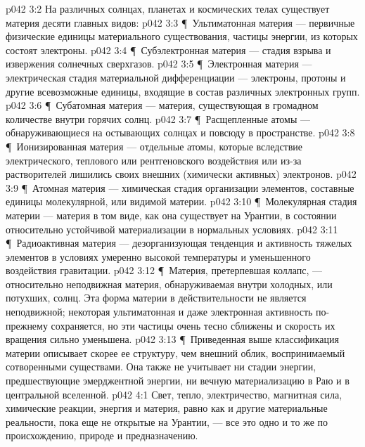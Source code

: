 \vs p042 3:2 На различных солнцах, планетах и космических телах существует материя десяти главных видов:
\vs p042 3:3 \P\ \bibnobreakspace Ультиматонная материя --- первичные физические единицы материального существования, частицы энергии, из которых состоят электроны.
\vs p042 3:4 \P\ \bibnobreakspace Субэлектронная материя --- стадия взрыва и извержения солнечных сверхгазов.
\vs p042 3:5 \P\ \bibnobreakspace Электронная материя --- электрическая стадия материальной дифференциации --- электроны, протоны и другие всевозможные единицы, входящие в состав различных электронных групп.
\vs p042 3:6 \P\ \bibnobreakspace Субатомная материя --- материя, существующая в громадном количестве внутри горячих солнц.
\vs p042 3:7 \P\ \bibnobreakspace Расщепленные атомы --- обнаруживающиеся на остывающих солнцах и повсюду в пространстве.
\vs p042 3:8 \P\ \bibnobreakspace Ионизированная материя --- отдельные атомы, которые вследствие электрического, теплового или рентгеновского воздействия или из\hyp{}за растворителей лишились своих внешних (химически активных) электронов.
\vs p042 3:9 \P\ \bibnobreakspace Атомная материя --- химическая стадия организации элементов, составные единицы молекулярной, или видимой материи.
\vs p042 3:10 \P\ \bibnobreakspace Молекулярная стадия материи --- материя в том виде, как она существует на Урантии, в состоянии относительно устойчивой материализации в нормальных условиях.
\vs p042 3:11 \P\ \bibnobreakspace Радиоактивная материя --- дезорганизующая тенденция и активность тяжелых элементов в условиях умеренно высокой температуры и уменьшенного воздействия гравитации.
\vs p042 3:12 \P\ \bibnobreakspace Материя, претерпевшая коллапс, --- относительно неподвижная материя, обнаруживаемая внутри холодных, или потухших, солнц. Эта форма материи в действительности не является неподвижной; некоторая ультиматонная и даже электронная активность по\hyp{}прежнему сохраняется, но эти частицы очень тесно сближены и скорость их вращения сильно уменьшена.
\vs p042 3:13 \P\ Приведенная выше классификация материи описывает скорее ее структуру, чем внешний облик, воспринимаемый сотворенными существами. Она также не учитывает ни стадии энергии, предшествующие эмерджентной энергии, ни вечную материализацию в Раю и в центральной вселенной.
\vs p042 4:1 Свет, тепло, электричество, магнитная сила, химические реакции, энергия и материя, равно как и другие материальные реальности, пока еще не открытые на Урантии, --- все это одно и то же по происхождению, природе и предназначению.
